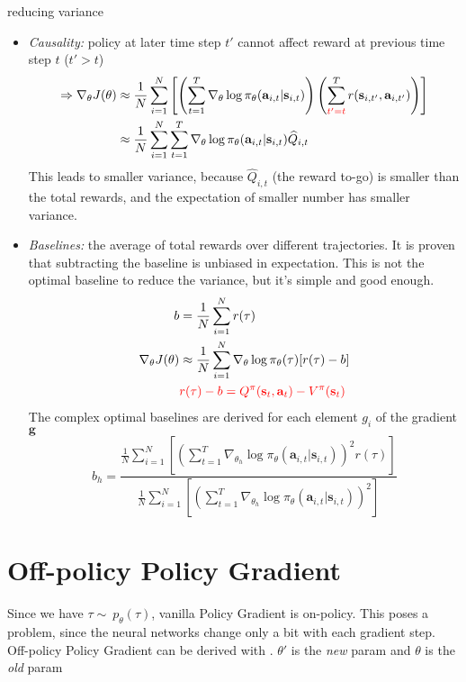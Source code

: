  reducing variance
\begin{itemize}
	\item \textit{Causality:} policy at later time step $t'$ cannot affect reward at previous time step $t$ ($t' > t$)
	\begin{align}
		\Rightarrow \nabla_\theta J(\theta) & \approx \frac{1}{N} \sum_{i=1}^{N} \left[ \left( \sum_{t=1}^{T} \nabla_\theta\log \pi_\theta(\textbf{a}_{i,t} | \textbf{s}_{i,t}) \right) \left( \sum^T_{\color{red} t'=t} r(\textbf{s}_{i,t'}, \textbf{a}_{i,t'}) \right) \right]\\
		& \approx \frac{1}{N} \sum_{i=1}^{N} \sum_{t=1}^{T} \nabla_\theta\log \pi_\theta(\textbf{a}_{i,t} | \textbf{s}_{i,t} ) \widehat{Q}_{i,t}
		\label{eq:Q-value}
	\end{align}
	This leads to smaller variance, because $\widehat{Q}_{i,t}$ (the reward to-go) is smaller than the total rewards, and the expectation of smaller number has smaller variance. \cite{sutton1999policy, baxter2001infinite}
	\item \textit{Baselines:} the average of total rewards over different trajectories. It is proven that subtracting the baseline is unbiased in expectation. This is not the optimal baseline to reduce the variance, but it's simple and good enough.
	\begin{align}
		b &= \frac{1}{N} \sum_{i=1}^{N}r(\tau)\\
		\nabla_\theta J(\theta) & \approx \frac{1}{N} \sum_{i=1}^{N} \nabla_\theta\log \pi_\theta(\tau) [r(\tau)-b]\\
		& {\color{red} r(\tau)-b = Q^\pi(\textbf{s}_t, \textbf{a}_t) - V^\pi(\textbf{s}_t)}
	\end{align}
	The complex optimal baselines are derived for each element $g_i$ of the gradient $\textbf{g}$ \cite{peters2008nn}
	\begin{equation}
		b_h = \frac{\displaystyle\frac{1}{N} \sum_{i=1}^N \left[\left(\sum_{t=1}^T \nabla_{\theta_h} \log \pi_\theta(\textbf{a}_{i,t} | \textbf{s}_{i,t})\right)^2 r(\tau)\right]}{\displaystyle\frac{1}{N} \sum_{i=1}^N \left[\left(\sum_{t=1}^T \nabla_{\theta_h} \log \pi_\theta(\textbf{a}_{i,t} | \textbf{s}_{i,t})\right)^2\right]}
	\end{equation}
\end{itemize}

\section{Off-policy Policy Gradient}
\label{sec:off-policy-policy-gradient}
Since we have $\tau\sim\ p_\theta(\tau)$, vanilla Policy Gradient is on-policy. This poses a problem, since the neural networks change only a bit with each gradient step. Off-policy Policy Gradient can be derived with . $\theta'$ is the \textit{new} \ac{param} and $\theta$ is the \textit{old} \ac{param}

